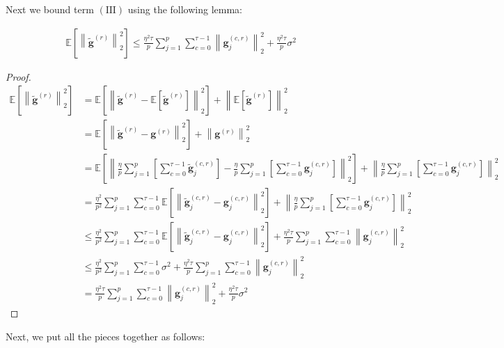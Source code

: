 \documentclass[review,onefignum,onetabnum]{siamart190516}
\begin{document}
Next we bound term $(\mathrm{III})$ using the following lemma:
\begin{lemma}
\begin{align}
    \mathbb{E}\left[\left\|\tilde{\mathbf{g}}^{(r)}\right\|_2^2\right]\leq \frac{\eta^2\tau}{p}\sum_{j=1}^{p}\sum_{c=0}^{\tau-1}\left\|\mathbf{g}_j^{(c,r)}\right\|^2_2+\frac{\eta^2\tau}{p}\sigma^2
\end{align}
\end{lemma}
\begin{proof}
\begin{align}
    \mathbb{E}\left[\left\|\tilde{\mathbf{g}}^{(r)}\right\|_2^2\right]&=\mathbb{E}\left[\left\|\tilde{\mathbf{g}}^{(r)}-\mathbb{E}\left[\tilde{\mathbf{g}}^{(r)}\right]\right\|_2^2\right]+\left\|\mathbb{E}\left[\tilde{\mathbf{g}}^{(r)}\right]\right\|^2_2\nonumber\\
    &= \mathbb{E}\left[\left\|\tilde{\mathbf{g}}^{(r)}-{\mathbf{g}}^{(r)}\right\|_2^2\right]+\left\|{\mathbf{g}}^{(r)}\right\|^2_2\nonumber\\
    &= \mathbb{E}\left[\left\|\frac{\eta}{p}\sum_{j=1}^{p}\left[\sum_{c=0}^{\tau-1}\tilde{\mathbf{g}}_j^{(c,r)}\right]-\frac{\eta}{p}\sum_{j=1}^{p}\left[\sum_{c=0}^{\tau-1}\mathbf{g}_j^{(c,r)}\right]\right\|_2^2\right]+\left\|\frac{\eta}{p}\sum_{j=1}^{p}\left[\sum_{c=0}^{\tau-1}\mathbf{g}_j^{(c,r)}\right]\right\|^2_2\nonumber\\
&=\frac{\eta^2}{p^2}\sum_{j=1}^{p}\sum_{c=0}^{\tau-1}\mathbb{E}\left[\left\|\tilde{\mathbf{g}}_j^{(c,r)}-\mathbf{g}_j^{(c,r)}\right\|_2^2\right]+\left\|\frac{\eta}{p}\sum_{j=1}^{p}\left[\sum_{c=0}^{\tau-1}\mathbf{g}_j^{(c,r)}\right]\right\|^2_2 \nonumber\\
&\leq \frac{\eta^2}{p^2}\sum_{j=1}^{p}\sum_{c=0}^{\tau-1}\mathbb{E}\left[\left\|\tilde{\mathbf{g}}_j^{(c,r)}-\mathbf{g}_j^{(c,r)}\right\|_2^2\right]+\frac{\eta^2\tau}{p}\sum_{j=1}^{p}\sum_{c=0}^{\tau-1}\left\|\mathbf{g}_j^{(c,r)}\right\|^2_2\nonumber\\
&\leq \frac{\eta^2}{p^2}\sum_{j=1}^{p}\sum_{c=0}^{\tau-1}\sigma^2+\frac{\eta^2\tau}{p}\sum_{j=1}^{p}\sum_{c=0}^{\tau-1}\left\|\mathbf{g}_j^{(c,r)}\right\|^2_2\nonumber\\
&=\frac{\eta^2\tau}{p}\sum_{j=1}^{p}\sum_{c=0}^{\tau-1}\left\|\mathbf{g}_j^{(c,r)}\right\|^2_2+\frac{\eta^2\tau}{p}\sigma^2
\end{align}
\end{proof}
Next, we put all the pieces together as follows:
\end{document}
